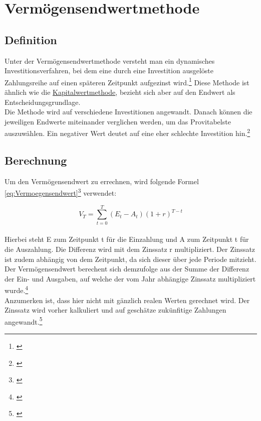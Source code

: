 \chapter{Vermögensendwertmethode}
\label{Vermoegensendwertmethode}

\section{Definition}
Unter der Vermögensendwertmethode versteht man ein dynamisches Investitionsverfahren, bei dem eine durch eine Investition ausgelöste Zahlungsreihe auf einen späteren Zeitpunkt aufgezinst wird.\footnote{\cite{finanzen-vermoegensendwertmethode}} Diese Methode ist ähnlich wie die  \hyperref[Kapitalwertmethode]{Kapitalwertmethode}, bezieht sich aber auf den Endwert als Entscheidungsgrundlage.\\
Die Methode wird auf verschiedene Investitionen angewandt. Danach können die jeweiligen Endwerte miteinander verglichen werden, um das Provitabelste auszuwählen. Ein negativer Wert deutet auf eine eher schlechte Investition hin.\footnote{\cite{bwllernen-endwertmethode}}

\section{Berechnung}
Um den Vermögensendwert zu errechnen, wird folgende Formel \eqref{eq:Vermoegensendwert}\footnote{\cite{studyflix-endwertmethode}} verwendet:

\begin{equation}
    V_T = \sum_{ t = 0 }^{ T }{(E_{ t } - A_{ t })(1 + r)^{T - t}}
    \label{eq:Vermoegensendwert}
\end{equation}
\smallskip\\
Hierbei steht E zum Zeitpunkt t für die Einzahlung und A zum Zeitpunkt t für die Auszahlung. Die Differenz wird mit dem Zinssatz r multipliziert. Der Zinssatz ist zudem abhängig von dem Zeitpunkt, da sich dieser über jede Periode mitzieht. Der Vermögensendwert berechent sich demzufolge aus der Summe der Differenz der Ein- und Ausgaben, auf welche der vom Jahr abhängige Zinssatz multipliziert wurde.\footnote{\cite{studyflix-endwertmethode}}\\

\noindent
Anzumerken ist, dass hier nicht mit gänzlich realen Werten gerechnet wird. Der Zinssatz wird vorher kalkuliert und auf geschätze zukünfitige Zahlungen angewandt.\footnote{\cite{finanzen-vermoegensendwertmethode}}

